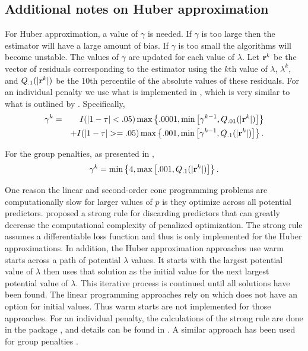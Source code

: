 \subsection{Additional notes on Huber approximation}\label{additional-notes-on-huber-approximation}

For Huber approximation, a value of \(\gamma\) is needed. If \(\gamma\) is too large then the estimator will have a large amount of bias. If \(\gamma\) is too small the algorithms will become unstable. The values of \(\gamma\) are updated for each value of \(\lambda\). Let \({\bf r}^k\) be the vector of residuals corresponding to the estimator using the \(k\)th value of \(\lambda\), \(\lambda^k\), and \(Q_{.1}(|{\bf r}^k|)\) be the 10th percentile of the absolute values of these residuals. For an individual penalty we use what is implemented in , which is very similar to what is outlined by \citet{huber_cd}. Specifically,
\begin{eqnarray*}
\gamma^k &=& I(|1-\tau|< .05)\max\left\{.0001,\min\left[\gamma^{k-1},Q_{.01}(|{\bf r}^k|)\right]\right\} \\
&& + I(|1-\tau|>=.05)\max\left\{.001,\min\left[\gamma^{k-1},Q_{.1}(|{\bf r}^k|)\right]\right\}.
\end{eqnarray*}

For the group penalties, as presented in \citet{SherwoodLi2022},
\begin{equation*}
\gamma^k = \min\left\{4, \max\left[.001, Q_{.1}(|{\bf r}^k|) \right] \right\}.
\end{equation*}

One reason the linear and second-order cone programming problems are computationally slow for larger values of \(p\) is they optimize across all potential predictors. \citet{tibshirani2012strong} proposed a strong rule for discarding predictors that can greatly decrease the computational complexity of penalized optimization. The strong rule assumes a differentiable loss function and thus is only implemented for the Huber approximations. In addition, the Huber approximation approaches use warm starts across a path of potential \(\lambda\) values. It starts with the largest potential value of \(\lambda\) then uses that solution as the initial value for the next largest potential value of \(\lambda\). This iterative process is continued until all solutions have been found. The linear programming approaches rely on  which does not have an option for initial values. Thus warm starts are not implemented for those approaches. For an individual penalty, the calculations of the strong rule are done in the package , and details can be found in \citet{huber_cd}. A similar approach has been used for group penalties \citep{SherwoodLi2022}.

